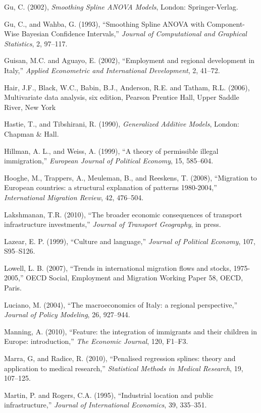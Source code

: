 \documentclass[10pt]{article}
\theoremstyle{definition}
\theoremstyle{plain}
\begin{document}
\begin{thebibliography}{99}
\bibitem{} Gu, C. (2002), \textit{Smoothing Spline ANOVA Models}, London: Springer-Verlag.

\bibitem{} Gu, C., and Wahba, G. (1993), ``Smoothing Spline ANOVA with Component-Wise Bayesian Confidence Intervals,'' \textit{Journal of Computational and Graphical Statistics}, 2, 97--117.

\bibitem{} Guisan, M.C. and Aguayo, E. (2002), ``Employment and regional development in Italy,'' \textit{Applied Econometric and International Development}, 2, 41--72.

\bibitem{} Hair, J.F., Black, W.C., Babin, B.J., Anderson, R.E. and Tatham, R.L. (2006), Multivariate data analysis, six edition, Pearson Prentice Hall, Upper Saddle River, New York

\bibitem{} Hastie, T., and Tibshirani, R. (1990), \textit{Generalized Additive Models}, London: Chapman $\&$ Hall.

\bibitem{} Hillman, A. L., and Weiss, A. (1999), ``A theory of permissible illegal immigration,'' \textit{European Journal of Political Economy}, 15, 585--604.

\bibitem{} Hooghe, M., Trappers, A., Meuleman, B., and Reeskens, T. (2008), ``Migration to European countries: a structural explanation of patterns 1980-2004,'' \textit{International Migration Review}, 42, 476--504.

\bibitem{} Lakshmanan, T.R. (2010), ``The broader economic consequences of transport infrastructure investments,'' \textit{Journal of Transport Geography}, in press.

\bibitem{} Lazear, E. P. (1999), ``Culture and language,'' \textit{Journal of Political Economy}, 107, S95--S126.

\bibitem{} Lowell, L. B. (2007), ``Trends in international migration flows and stocks, 1975-2005,'' OECD Social, Employment and Migration Working Paper 58, OECD, Paris.

\bibitem{} Luciano, M. (2004), ``The macroeconomics of Italy: a regional perspective,'' \textit{Journal of Policy Modeling}, 26, 927--944.

\bibitem{} Manning, A. (2010), ``Feature: the integration of immigrants and their children in Europe: introduction,'' \textit{The Economic Journal}, 120, F1--F3. 

\bibitem{} Marra, G, and Radice, R. (2010), ``Penalised regression splines: theory and application to medical research,'' \textit{Statistical Methods in Medical Research}, 19, 107--125.

\bibitem{} Martin, P. and Rogers, C.A. (1995), ``Industrial location and public infrastructure,'' \textit{Journal of International Economics}, 39, 335--351.


\end{thebibliography}
\end{document}
